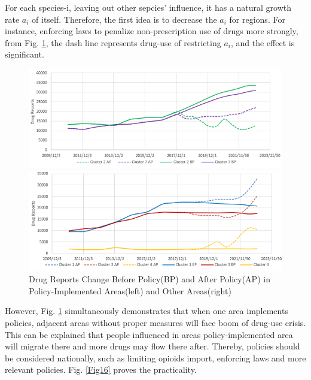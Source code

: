 \documentclass[11pt]{article}
\begin{document}
For each species-i, leaving out other sepcies' influence, it has a natural growth rate $a_{i}$ of itself. Therefore, the first idea is to decrease the $a_{i}$ for regions. For instance, enforcing laws to penalize non-prescription use of drugs more strongly, from Fig. \ref{Fig14}, the dash line represents drug-use of restricting $a_{i}$, and the effect is significant.

\begin{figure}[H]
	\centering %
	\begin{minipage}[b]{0.48\textwidth} %
		\centering %
		\includegraphics[scale=0.6]{./figures/13.png} %
	\end{minipage}
	\begin{minipage}[b]{0.48\textwidth} %
		\centering %
		\includegraphics[scale=0.6]{./figures/14.png}%
	\end{minipage}
	\caption{Drug Reports Change Before Policy(BP) and After Policy(AP) in Policy-Implemented Areas(left) and Other Areas(right)}
	\label{Fig14}
\end{figure}

However, Fig. \ref{Fig14} simultaneously demonstrates that when one area implements policies, adjacent areas without proper measures will face boom of drug-use crisis. This can be explained that people influenced in areas policy-implemented area will migrate there and more drugs may flow there after. Thereby, policies should be considered nationally, such as limiting opioids import, enforcing laws and more relevant policies. Fig. \ref{Fig16} proves the practicality.
\end{document}
